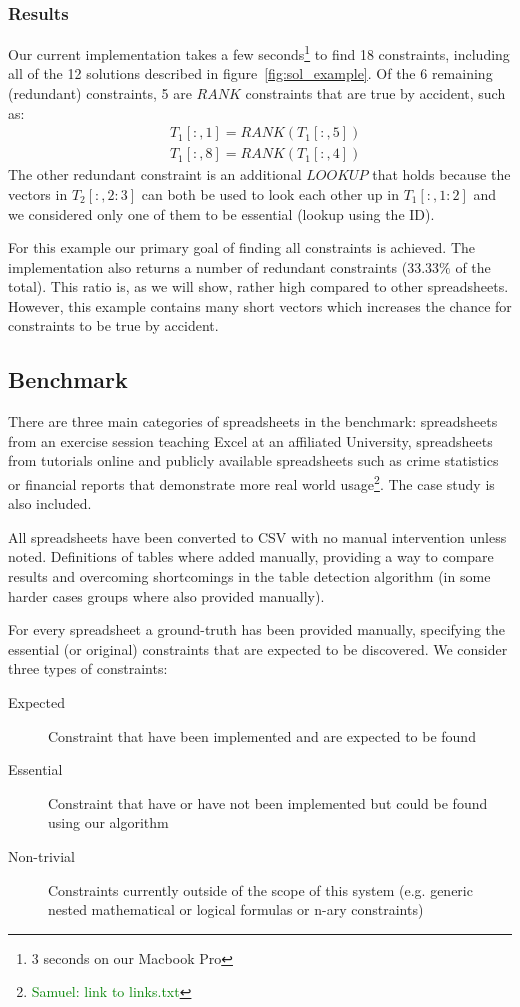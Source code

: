 \documentclass{ecai}
\newcommand{\samuel}[1]{\textcolor{green}{{\sc Samuel:} #1}\xspace}
\newcommand{\range}[3]{\ensuremath{#1[#2,#3]}}
\newcommand{\rangeto}[2]{#1{:}#2}
\newcommand{\rangeall}{:}
\newcommand{\ecrank}[2]{\ensuremath{#1 = \mathit{RANK}(#2)}}
\begin{document}
\subsubsection{Results}
Our current implementation takes a few seconds\footnote{3 seconds on our Macbook Pro} to find 18 constraints, including all of the 12 solutions described in figure~\ref{fig:sol_example}.
Of the 6 remaining (redundant) constraints, 5 are $\mathit{RANK}$ constraints that are true by accident, such as: \begin{align*}
  & \ecrank{\range{T_1}{\rangeall}{1}}{\range{T_1}{\rangeall}{5}} \\
  & \ecrank{\range{T_1}{\rangeall}{8}}{\range{T_1}{\rangeall}{4}}
\end{align*}
The other redundant constraint is an additional $\mathit{LOOKUP}$ that holds because the vectors in \range{T_2}{\rangeall}{\rangeto{2}{3}} can both be used to look each other up in \range{T_1}{\rangeall}{\rangeto{1}{2}} and we considered only one of them to be essential (lookup using the ID).

For this example our primary goal of finding all constraints is achieved.
The implementation also returns a number of redundant constraints ($33.33\%$ of the total).
This ratio is, as we will show, rather high compared to other spreadsheets.
However, this example contains many short vectors which increases the chance for constraints to be true by accident.

\subsection{Benchmark}
There are three main categories of spreadsheets in the benchmark: spreadsheets from an exercise session teaching Excel at an affiliated University, spreadsheets from tutorials online and publicly available spreadsheets such as crime statistics or financial reports that demonstrate more real world usage\footnote{\samuel{link to links.txt}}.
The case study is also included.

All spreadsheets have been converted to CSV with no manual intervention unless noted.
Definitions of tables where added manually, providing a way to compare results and overcoming shortcomings in the table detection algorithm (in some harder cases groups where also provided manually).

For every spreadsheet a ground-truth has been provided manually, specifying the essential (or original) constraints that are expected to be discovered.
We consider three types of constraints:
\begin{description}
  \item[Expected] Constraint that have been implemented and are expected to be found
  \item[Essential] Constraint that have or have not been implemented but could be found using our algorithm
  \item[Non-trivial] Constraints currently outside of the scope of this system (e.g. generic nested mathematical or logical formulas or n-ary constraints)
\end{description}
\end{document}

